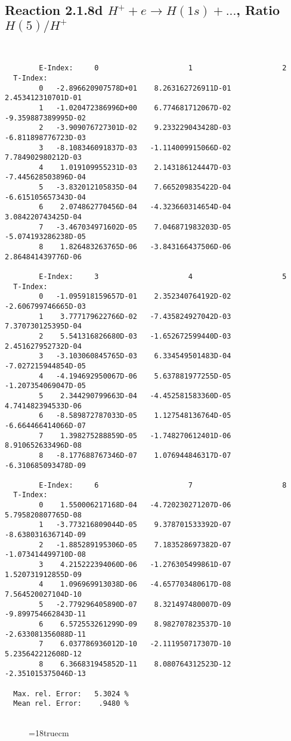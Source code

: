\subsection{
Reaction 2.1.8d  $H^+ + e \rightarrow H(1s) + ...$,  Ratio $H(5)/H^+$
}

\begin{verbatim}


        E-Index:     0                     1                     2
  T-Index:
        0   -2.896620907578D+01    8.263162726911D-01    2.453412310701D-01
        1   -1.020472386996D+00    6.774681712067D-02   -9.359887389995D-02
        2   -3.909076727301D-02    9.233229043428D-03   -6.811898776723D-03
        3   -8.108346091837D-03   -1.114009915066D-02    7.784902980212D-03
        4    1.019109955231D-03    2.143186124447D-03   -7.445628503896D-04
        5   -3.832012105835D-04    7.665209835422D-04   -6.615105657343D-04
        6    2.074862770456D-04   -4.323660314654D-04    3.084220743425D-04
        7   -3.467034971602D-05    7.046871983203D-05   -5.074193286238D-05
        8    1.826483263765D-06   -3.843166437506D-06    2.864841439776D-06

        E-Index:     3                     4                     5
  T-Index:
        0   -1.095918159657D-01    2.352340764192D-02   -2.606799746665D-03
        1    3.777179622766D-02   -7.435824927042D-03    7.370730125395D-04
        2    5.541316826680D-03   -1.652672599440D-03    2.451627952732D-04
        3   -3.103060845765D-03    6.334549501483D-04   -7.027215944854D-05
        4   -4.194692950067D-06    5.637881977255D-05   -1.207354069047D-05
        5    2.344290799663D-04   -4.452581583360D-05    4.741482394533D-06
        6   -8.589872787033D-05    1.127548136764D-05   -6.664466414066D-07
        7    1.398275288859D-05   -1.748270612401D-06    8.910652633496D-08
        8   -8.177688767346D-07    1.076944846317D-07   -6.310685093478D-09

        E-Index:     6                     7                     8
  T-Index:
        0    1.550006217168D-04   -4.720230271207D-06    5.795820807765D-08
        1   -3.773216809044D-05    9.378701533392D-07   -8.638031636714D-09
        2   -1.885289195306D-05    7.183528697382D-07   -1.073414499710D-08
        3    4.215222394060D-06   -1.276305499861D-07    1.520731912855D-09
        4    1.096969913038D-06   -4.657703480617D-08    7.564520027104D-10
        5   -2.779296405890D-07    8.321497480007D-09   -9.899754662843D-11
        6    6.572553261299D-09    8.982707823537D-10   -2.633081356088D-11
        7    6.037786936012D-10   -2.111950717307D-10    5.235642212608D-12
        8    6.366831945852D-11    8.080764312523D-12   -2.351015375046D-13

  Max. rel. Error:   5.3024 %
  Mean rel. Error:    .9480 %


\end{verbatim}
\begin{figure} \label{2.1.8rd}
\epsfxsize=18truecm
\end{figure}
\newpage


